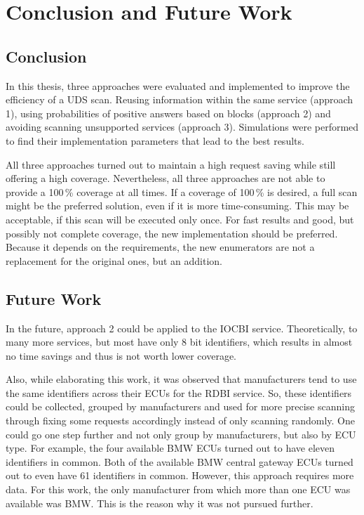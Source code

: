 \chapter{Conclusion and Future Work}

\section{Conclusion}

In this thesis, three approaches were evaluated and implemented to improve the efficiency of a UDS scan. Reusing information within the same service (approach 1), using probabilities of positive answers based on blocks (approach 2) and avoiding scanning unsupported services (approach 3). Simulations were performed to find their implementation parameters that lead to the best results.

All three approaches turned out to maintain a high request saving while still offering a high coverage.
Nevertheless, all three approaches are not able to provide a 100\,\% coverage at all times. 
If a coverage of 100\,\% is desired, a full scan might be the preferred solution, even if it is more time-consuming. This may be acceptable, if this scan will be executed only once. For fast results and good, but possibly not complete coverage, the new implementation should be preferred. Because it depends on the requirements, the new enumerators are not a replacement for the original ones, but an addition.

\section{Future Work}

In the future, approach 2 could be applied to the IOCBI service. Theoretically, to many more services, but most have only 8 bit identifiers, which results in almost no time savings and thus is not worth lower coverage.

Also, while elaborating this work, it was observed that manufacturers tend to use the same identifiers across their ECUs for the RDBI service. So, these identifiers could be collected, grouped by manufacturers and used for more precise scanning through fixing some requests accordingly instead of only scanning randomly. One could go one step further and not only group by manufacturers, but also by ECU type.
For example, the four available BMW ECUs turned out to have eleven identifiers in common. Both of the available BMW central gateway ECUs turned out to even have 61 identifiers in common. However, this approach requires more data. For this work, the only manufacturer from which more than one ECU was available was BMW. This is the reason why it was not pursued further.

